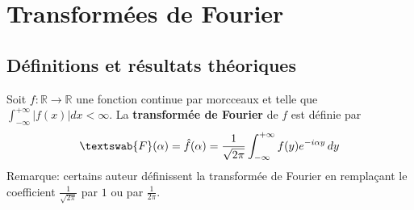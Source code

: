 \chapter{Transformées de Fourier}
\label{chap:FourierTrans}
\section{Définitions et résultats théoriques}
\begin{myDefinition}
	Soit $f: \mathbb{R}\rightarrow\mathbb{R}$ une fonction continue par morcceaux et telle que $\int_{-\infty}^{+\infty}|f(x)|dx<\infty$. La \textbf{transformée de Fourier} de $f$ est définie par
	\begin{eqnarray}
		\textswab{F}(\alpha)=\hat{f}(\alpha)=\frac{1}{\sqrt{2\pi}}\int_{-\infty}^{+\infty}f(y)e^{-i\alpha y}\,dy
	\end{eqnarray}
	Remarque: certains auteur définissent la transformée de Fourier en remplaçant le coefficient $\frac{1}{\sqrt{2\pi}}$ par $1$ ou par $\frac{1}{2\pi}$.
\end{myDefinition}

